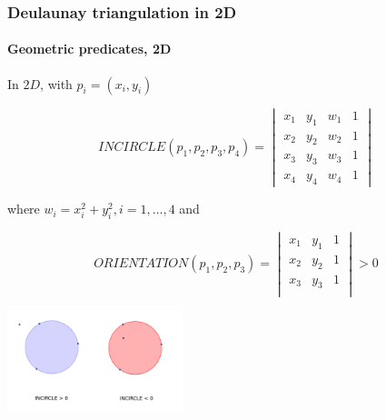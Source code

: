 \documentclass[c, 10pt]{beamer}
\begin{document}
\begin{frame}\frametitle{Deulaunay triangulation in 2D}\framesubtitle{Geometric predicates, 2D}
\begin{small}
In $2D$, with $p_i = (x_i, y_i)$

$$INCIRCLE(p_1,p_2,p_3,p_4) = \begin{vmatrix} x_1 & y_1 & w_1 & 1 \\
x_2 & y_2 & w_2 & 1 \\
x_3 & y_3 &  w_3 & 1 \\
x_4 & y_4 &  w_4 & 1\end{vmatrix}$$

where $w_i = x_i^2  + y_i^2, i = 1,\dots, 4$ and 

$$ORIENTATION(p_1,p_2,p_3) = 
\begin{vmatrix} 
x_1 & y_1 & 1 \\
x_2 & y_2 & 1 \\
x_3 & y_3 & 1 \\
\end{vmatrix} > 0$$
\end{small}

\begin{center}
\includegraphics[height = 3cm]{./FigureLayout/Incircle.png}
\end{center}

\end{frame}
\end{document}
